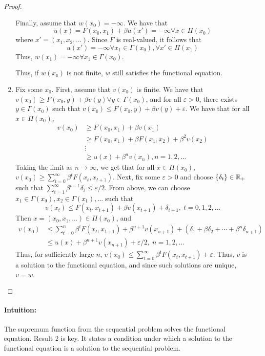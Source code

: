 \documentclass[10pt]{article}
\begin{document}
\begin{proof}
\begin{enumerate}
		Finally, assume that $w(x_0) = -\infty$. We have that
		\[
		u(x) = F(x_0,x_1) + \beta u(x') = -\infty \forall x \in \Pi(x_0)
		\]
		where $x' = (x_1,x_2,\dots)$. Since $F$ is real-valued, it follows that
		\[
		u(x') = -\infty \forall x_1 \in \Gamma(x_0), \forall x' \in \Pi(x_1)
		\]
		Thus, $w(x_1) = -\infty \forall x_1 \in \Gamma(x_0)$. 
		
		Thus, if $w(x_0)$ is not finite, $w$ still satisfies the functional equation.
		
		\item Fix some $x_0$. First, assume that $v(x_0)$ is finite. We have that $v(x_0) \ge F(x_0,y) + \beta v(y) \forall y \in \Gamma(x_0)$, and for all $\varepsilon > 0$, there exists $y \in \Gamma(x_0)$ such that $v(x_0) \le F(x_0,y) + \beta v(y) + \varepsilon$. We have that for all $x\in \Pi(x_0)$, 
		\begin{align*}
			v(x_0) &\ge F(x_0,x_1) + \beta v(x_1) \\
			&\ge F(x_0,x_1) + \beta F(x_1,x_2) + \beta^2 v(x_2) \\
			&\vdots \\
			&\ge u(x) + \beta^{n} v(x_n) , n = 1,2,\dots 
		\end{align*}
		Taking the limit as $n \to \infty$, we get that for all $x \in \Pi(x_0)$, $v(x_0) \ge \sum_{t=0}^\infty \beta^t F(x_t,x_{t+1})$. Next, fix some $\varepsilon > 0$ and choose $\{\delta_t\} \in \mathbb{R}_+$ such that $\sum_{t=1}^\infty \beta^{t-1}\delta_t \le \varepsilon / 2$. From above, we can choose $x_1 \in \Gamma(x_0), x_2 \in \Gamma(x_1),\dots$ such that
		\[
		v(x_t) \le F(x_t,x_{t+1}) + \beta v(x_{t+1}) + \delta_{t+1}, \;t = 0,1,2,\dots
		\]
		Then $x = (x_0,x_1,\dots) \in \Pi(x_0)$, and
		\begin{align*}
			v(x_0) &\le \sum_{t=0}^n \beta^t F(x_t,x_{t+1}) + \beta^{n+1}v(x_{n+1}) + (\delta_1 + \beta \delta_2 + \cdots + \beta^n \delta_{n+1}) \\
			&\le u(x) + \beta^{n+1}v(x_{n+1}) + \varepsilon / 2 ,\; n = 1,2,\dots
		\end{align*}
		Thus, for sufficiently large $n$, $v(x_0) \le \sum_{t=0}^\infty \beta^t F(x_t,x_{t+1}) + \varepsilon$. Thus, $v$ is a solution to the functional equation, and since such solutions are unique, $v = w$.
	\end{enumerate}
\end{proof}

\paragraph{Intuition:} The supremum function from the sequential problem solves the functional equation. Result 2 is key. It states a condition under which a solution to the functional equation is a solution to the sequential problem.
\end{document}
